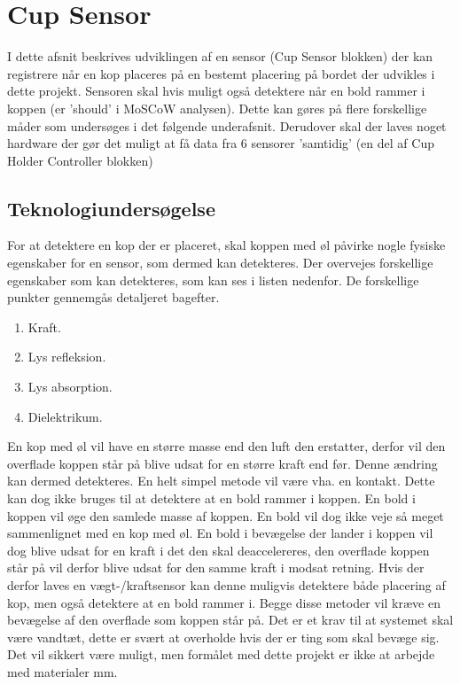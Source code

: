 \documentclass[HardwareDesign/HardwareDesign_main.tex]{subfiles}
\begin{document}
\section{Cup Sensor} \label{sec:CupSensor}
I dette afsnit beskrives udviklingen af en sensor (Cup Sensor blokken) der kan registrere når en kop placeres på en bestemt placering på bordet der udvikles i dette projekt. Sensoren skal hvis muligt også detektere når en bold rammer i koppen (er 
'should' i MoSCoW analysen). Dette kan gøres på flere forskellige måder som undersøges i det følgende underafsnit. Derudover skal der laves noget hardware der gør det muligt at få data fra 6 sensorer 'samtidig' (en del af Cup Holder Controller blokken)

\subsection{Teknologiundersøgelse}
For at detektere en kop der er placeret, skal koppen med øl påvirke nogle fysiske egenskaber for en sensor, som dermed kan detekteres. Der overvejes forskellige egenskaber som kan detekteres, som kan ses i listen nedenfor. De forskellige punkter gennemgås detaljeret bagefter.
\begin{enumerate}
    \item \label{itm:cupSensor_weight} Kraft.
    \item \label{itm:cupSensor_lightReflection} Lys refleksion. 
    \item \label{itm:cupSensor_lightAbsorbtion} Lys absorption.
    \item \label{itm:cupSensor_capacitive} Dielektrikum.
\end{enumerate}

En kop med øl vil have en større masse end den luft den erstatter, derfor vil den overflade koppen står på blive udsat for en større kraft end før. Denne ændring kan dermed detekteres. En helt simpel metode vil være vha. en kontakt. Dette kan dog ikke bruges til at detektere at en bold rammer i koppen. En bold i koppen vil øge den samlede masse af koppen. En bold vil dog ikke veje så meget sammenlignet med en kop med øl. En bold i bevægelse der lander i koppen vil dog blive udsat for en kraft i det den skal deaccelereres, den overflade koppen står på vil derfor blive udsat for den samme kraft i modsat retning. Hvis der derfor laves en vægt-/kraftsensor kan denne muligvis detektere både placering af kop, men også detektere at en bold rammer i. Begge disse metoder vil kræve en bevægelse af den overflade som koppen står på. Det er et krav til at systemet skal være vandtæt,  dette er svært at overholde hvis der er ting som skal bevæge sig. Det vil sikkert være muligt, men formålet med dette projekt er ikke at arbejde med materialer mm.
\end{document}
